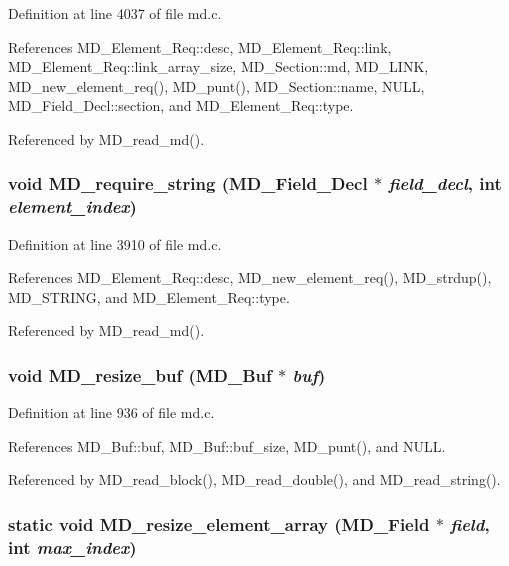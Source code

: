 Definition at line 4037 of file md.c.

References MD\_\-Element\_\-Req::desc, MD\_\-Element\_\-Req::link, MD\_\-Element\_\-Req::link\_\-array\_\-size, MD\_\-Section::md, MD\_\-LINK, MD\_\-new\_\-element\_\-req(), MD\_\-punt(), MD\_\-Section::name, NULL, MD\_\-Field\_\-Decl::section, and MD\_\-Element\_\-Req::type.

Referenced by MD\_\-read\_\-md().
\subsubsection{\setlength{\rightskip}{0pt plus 5cm}void MD\_\-require\_\-string (\bf{MD\_\-Field\_\-Decl} $\ast$ {\em field\_\-decl}, int {\em element\_\-index})}\label{md_8c_a96bd277bec6297de1464775cba610de}




Definition at line 3910 of file md.c.

References MD\_\-Element\_\-Req::desc, MD\_\-new\_\-element\_\-req(), MD\_\-strdup(), MD\_\-STRING, and MD\_\-Element\_\-Req::type.

Referenced by MD\_\-read\_\-md().
\subsubsection{\setlength{\rightskip}{0pt plus 5cm}void MD\_\-resize\_\-buf (\bf{MD\_\-Buf} $\ast$ {\em buf})}\label{md_8c_22473b492cfc6bfa3242f6ed2e80b986}




Definition at line 936 of file md.c.

References MD\_\-Buf::buf, MD\_\-Buf::buf\_\-size, MD\_\-punt(), and NULL.

Referenced by MD\_\-read\_\-block(), MD\_\-read\_\-double(), and MD\_\-read\_\-string().
\subsubsection{\setlength{\rightskip}{0pt plus 5cm}static void MD\_\-resize\_\-element\_\-array (\bf{MD\_\-Field} $\ast$ {\em field}, int {\em max\_\-index})\hspace{0.3cm}{\tt  [static]}}\label{md_8c_d02d91a3c0a43855f5a720993e61267b}




